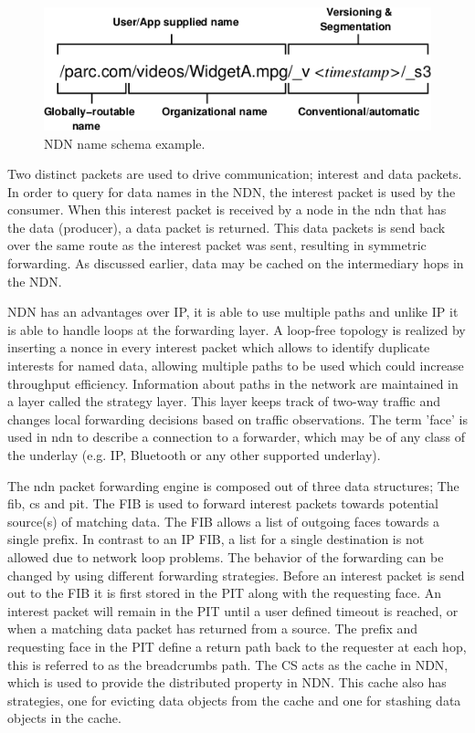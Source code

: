 \begin{figure}[H]
\centering
\includegraphics[width=\columnwidth/2]{Images/ndn_name.png}
\caption{NDN name schema example.}
\label{fig:ndn_name}
\end{figure}

Two distinct packets are used to drive communication; interest and data packets. In order to query for data names in the NDN, the interest packet is used by the consumer. When this interest packet is received by a node in the \gls{ndn} that has the data (producer), a data packet is returned. This data packets is send back over the same route as the interest packet was sent, resulting in symmetric forwarding. As discussed earlier, data may be cached on the intermediary hops in the NDN.

NDN has an advantages over IP, it is able to use multiple paths and unlike IP it is able to handle loops at the forwarding layer. A loop-free topology is realized by inserting a nonce in every interest packet which allows to identify duplicate interests for named data, allowing multiple paths to be used which could increase throughput efficiency. Information about paths in the network are maintained in a layer called the strategy layer. This layer keeps track of two-way traffic and changes local forwarding decisions based on traffic observations. The term 'face' is used in \gls{ndn} to describe a connection to a forwarder, which may be of any class of the underlay (e.g. IP, Bluetooth or any other supported underlay).

The \gls{ndn} packet forwarding engine is composed out of three data structures; The \gls{fib}, \gls{cs} and \gls{pit}. The FIB is used to forward interest packets towards potential source(s) of matching data. The FIB allows a list of outgoing faces towards a single prefix. In contrast to an IP FIB, a list for a single destination is not allowed due to network loop problems. The behavior of the forwarding can be changed by using different forwarding strategies. Before an interest packet is send out to the FIB it is first stored in the PIT along with the requesting face. An interest packet will remain in the PIT until a user defined timeout is reached, or when a matching data packet has returned from a source. The prefix and requesting face in the PIT define a return path back to the requester at each hop, this is referred to as the breadcrumbs path. The CS acts as the cache in NDN, which is used to provide the distributed property in NDN. This cache also has strategies, one for evicting data objects from the cache and one for stashing data objects in the cache.

